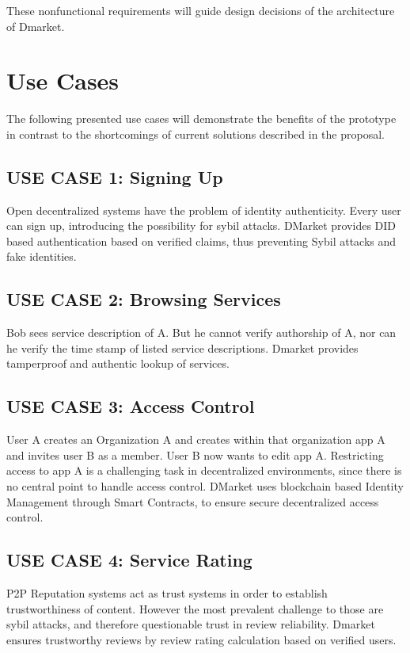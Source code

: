 These nonfunctional requirements will guide design decisions of the architecture of Dmarket. 

\section{Use Cases}

The following presented use cases will demonstrate the benefits of the prototype in contrast to the shortcomings of current solutions described in the proposal. 

\subsection{USE CASE 1: Signing Up}
Open decentralized systems have the problem of identity authenticity. Every user can sign up, introducing the possibility for sybil attacks. DMarket provides DID based authentication based on verified claims, thus preventing Sybil attacks and fake identities. 

\subsection{USE CASE 2: Browsing Services}
Bob sees service description of A. But he cannot verify authorship of A, nor can he verify the time stamp of listed service descriptions. Dmarket provides tamperproof and authentic lookup of services. 

\subsection{USE CASE 3: Access Control}
User A creates an Organization A and creates within that organization app A and invites user B as a member. User B now wants to edit app A.
Restricting access to app A is a challenging task in decentralized environments, since there is no central point to handle access control. DMarket uses blockchain based Identity Management through Smart Contracts, to ensure secure decentralized access control. 

\subsection{USE CASE 4: Service Rating}
P2P Reputation systems act as trust systems in order to establish trustworthiness of content. However the most prevalent challenge to those are sybil attacks, and therefore questionable trust in review reliability. Dmarket ensures trustworthy reviews by review rating calculation based on verified users. 

